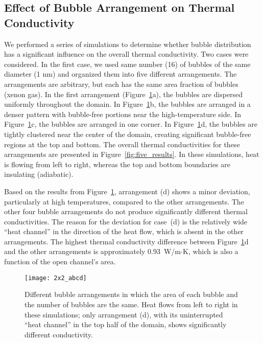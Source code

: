 \subsection{Effect of Bubble Arrangement on Thermal Conductivity}
\label{subsec:area}
We performed a series of simulations to determine whether bubble distribution has a significant influence on the overall thermal conductivity. Two cases were considered. In the first case, we used same number (16) of bubbles of the same diameter (1 nm) and organized them into five different arrangements. The arrangements are arbitrary, but each has the same area fraction of bubbles (xenon gas). In the first arrangement (Figure~\ref{fig:five_figures}a), the bubbles are dispersed uniformly throughout the domain. In Figure~\ref{fig:five_figures}b, the bubbles are arranged in a denser pattern with bubble-free portions near the high-temperature side. In Figure~\ref{fig:five_figures}c, the bubbles are arranged in one corner. In Figure~\ref{fig:five_figures}d, the bubbles are tightly clustered near the center of the domain, creating significant bubble-free regions at the top and bottom. The overall thermal conductivities for these arrangements are presented in Figure~\ref{fig:five_results}.
In these simulations, heat is flowing from left to right, whereas the top and bottom boundaries are insulating (adiabatic).

Based on the results from Figure~\ref{fig:five_figures}, arrangement (d) shows a minor deviation, particularly at high temperatures, compared to the other arrangements. The other four bubble arrangements do not produce significantly different thermal conductivities. The reason for the deviation for case~(d) is the relatively wide ``heat channel'' in the direction of the heat flow, which is absent in the other arrangements. The highest thermal conductivity difference between Figure~\ref{fig:five_figures}d and the other arrangements is approximately 0.93~W/m$\cdot$K, which is also a function of the open channel's area.

\begin{figure}
	\centering
	\texttt{[image: 2x2\_abcd]}
    \caption{Different bubble arrangements in which the area of each bubble and
      the number of bubbles are the same. Heat flows from left to right in
      these simulations; only arrangement (d), with its uninterrupted ``heat
      channel'' in the top half of the domain, shows significantly different
      conductivity.}
	\label{fig:five_figures} 
\end{figure}

